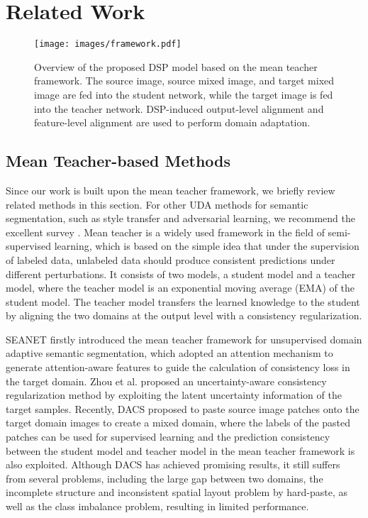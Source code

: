\documentclass[sigconf]{acmart}
\begin{document}
\section{Related Work}

\begin{figure*}[htbp]
    \centering
    \texttt{[image: images/framework.pdf]}
    \caption{Overview of the proposed DSP model based on the mean teacher framework. The source image, source mixed image, and target mixed image are fed into the student network, while the target image is fed into the teacher network. DSP-induced output-level alignment and feature-level alignment are used to perform domain adaptation.}
    \label{framework}
\end{figure*}

\subsection{Mean Teacher-based Methods}
Since our work is built upon the mean teacher framework, we briefly review related methods in this section. For other UDA methods for semantic segmentation, such as style transfer and adversarial learning, we recommend the excellent survey \cite{review}. Mean teacher is a widely used framework in the field of semi-supervised learning, which is based on the simple idea that under the supervision of labeled data, unlabeled data should produce consistent predictions under different perturbations. It consists of two models, a student model and a teacher model, where the teacher model is an exponential moving average (EMA) of the student model. The teacher model transfers the learned knowledge to the student \cite{meanteacher} by aligning the two domains at the output level with a consistency regularization.

SEANET \cite{SEANET} firstly introduced the mean teacher framework for unsupervised domain adaptive semantic segmentation, which adopted an attention mechanism to generate attention-aware features to guide the calculation of consistency loss in the target domain. Zhou et al. \cite{uacr} proposed an uncertainty-aware consistency regularization method by exploiting the latent uncertainty information of the target samples. Recently, DACS \cite{dacs} proposed to paste source image patches onto the target domain images to create a mixed domain, where the labels of the pasted patches can be used for supervised learning and the prediction consistency between the student model and teacher model in the mean teacher framework is also exploited. Although DACS has achieved promising results, it still suffers from several problems, including the large gap between two domains, the incomplete structure and inconsistent spatial layout problem by hard-paste, as well as the class imbalance problem, resulting in limited performance. 
\end{document}
